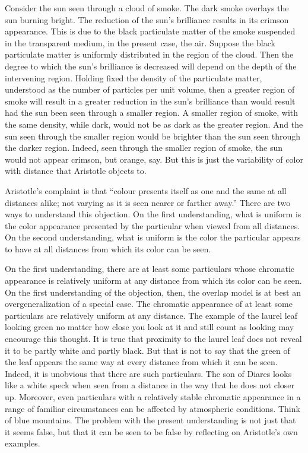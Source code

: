 Consider the sun seen through a cloud of smoke. The dark smoke overlays the sun burning bright. The reduction of the sun's brilliance results in its crimson appearance. This is due to the black particulate matter of the smoke suspended in the transparent medium, in the present case, the air. Suppose the black particulate matter is uniformly distributed in the region of the cloud. Then the degree to which the sun's brilliance is decreased will depend on the depth of the intervening region. Holding fixed the density of the particulate matter, understood as the number of particles per unit volume, then a greater region of smoke will result in a greater reduction in the sun's brilliance than would result had the sun been seen through a smaller region. A smaller region of smoke, with the same density, while dark, would not be as dark as the greater region. And the sun seen through the smaller region would be brighter than the sun seen through the darker region. Indeed, seen through the smaller region of smoke, the sun would not appear crimson, but orange, say. But this is just the variability of color with distance that Aristotle objects to.

Aristotle's complaint is that ``colour presents itself as one and the same at all distances alike; not varying as it is seen nearer or farther away.'' There are two ways to understand this objection. On the first understanding, what is uniform is the color appearance presented by the particular when viewed from all distances. On the second understanding, what is uniform is the color the particular appears to have at all distances from which its color can be seen.

On the first understanding, there are at least some particulars whose chromatic appearance is relatively uniform at any distance from which its color can be seen. On the first understanding of the objection, then, the overlap model is at best an overgeneralization of a special case. The chromatic appearance of at least some particulars are relatively uniform at any distance. The example of the laurel leaf looking green no matter how close you look at it and still count as looking may encourage this thought. It is true that proximity to the laurel leaf does not reveal it to be partly white and partly black. But that is not to say that the green of the leaf appears the same way at every distance from which it can be seen. Indeed, it is unobvious that there are such particulars. The son of Diares looks like a white speck when seen from a distance in the way that he does not closer up. Moreover, even particulars with a relatively stable chromatic appearance in a range of familiar circumstances can be affected by atmospheric conditions. Think of blue mountains. The problem with the present understanding is not just that it seems false, but that it can be seen to be false by reflecting on Aristotle's own examples. 

